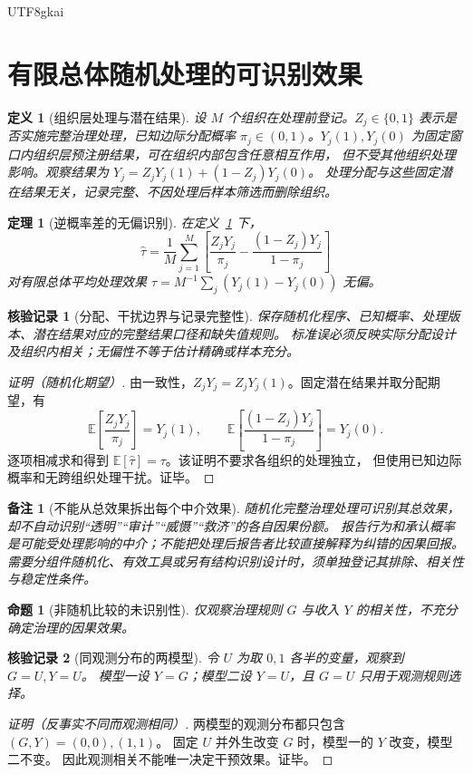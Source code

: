\documentclass[12pt,a4paper,openany]{report}
\newtheorem{definition}{定义}[chapter]
\newtheorem{theorem}{定理}[chapter]
\newtheorem{proposition}{命题}[chapter]
\newtheorem{remark}{备注}[chapter]
\newtheorem{Certificate}{核验记录}[chapter]
\newcommand{\EE}{\mathbb E}
\begin{document}
\begin{CJK*}{UTF8}{gkai}
\section{有限总体随机处理的可识别效果}

\begin{definition}[组织层处理与潜在结果]
\label{def:potential}
设 $M$ 个组织在处理前登记。$Z_j\in\{0,1\}$ 表示是否实施完整治理处理，已知边际分配概率
$\pi_j\in(0,1)$。$Y_j(1),Y_j(0)$ 为固定窗口内组织层预注册结果，可在组织内部包含任意相互作用，
但不受其他组织处理影响。观察结果为 $Y_j=Z_jY_j(1)+(1-Z_j)Y_j(0)$。
处理分配与这些固定潜在结果无关，记录完整、不因处理后样本筛选而删除组织。
\end{definition}

\begin{theorem}[逆概率差的无偏识别]
\label{thm:identification}
在定义~\ref{def:potential} 下，
\[
 \widehat\tau=\frac1M\sum_{j=1}^M
 \left[\frac{Z_jY_j}{\pi_j}-\frac{(1-Z_j)Y_j}{1-\pi_j}\right]
\]
对有限总体平均处理效果
$\tau=M^{-1}\sum_j(Y_j(1)-Y_j(0))$ 无偏。
\end{theorem}
\begin{Certificate}[分配、干扰边界与记录完整性]
保存随机化程序、已知概率、处理版本、潜在结果对应的完整结果口径和缺失值规则。
标准误必须反映实际分配设计及组织内相关；无偏性不等于估计精确或样本充分。
\end{Certificate}
\begin{proof}[证明（随机化期望）]
由一致性，$Z_jY_j=Z_jY_j(1)$。固定潜在结果并取分配期望，有
\[
 \EE\left[\frac{Z_jY_j}{\pi_j}\right]=Y_j(1),\qquad
 \EE\left[\frac{(1-Z_j)Y_j}{1-\pi_j}\right]=Y_j(0).
\]
逐项相减求和得到 $\EE[\widehat\tau]=\tau$。该证明不要求各组织的处理独立，
但使用已知边际概率和无跨组织处理干扰。证毕。
\end{proof}

\begin{remark}[不能从总效果拆出每个中介效果]
随机化完整治理处理可识别其总效果，却不自动识别“透明”“审计”“威慑”“救济”的各自因果份额。
报告行为和承认概率是可能受处理影响的中介；不能把处理后报告者比较直接解释为纠错的因果回报。
需要分组件随机化、有效工具或另有结构识别设计时，须单独登记其排除、相关性与稳定性条件。
\end{remark}

\begin{proposition}[非随机比较的未识别性]
\label{prop:confounding}
仅观察治理规则 $G$ 与收入 $Y$ 的相关性，不充分确定治理的因果效果。
\end{proposition}
\begin{Certificate}[同观测分布的两模型]
令 $U$ 为取 $0,1$ 各半的变量，观察到 $G=U,Y=U$。
模型一设 $Y=G$；模型二设 $Y=U$，且 $G=U$ 只用于观测规则选择。
\end{Certificate}
\begin{proof}[证明（反事实不同而观测相同）]
两模型的观测分布都只包含 $(G,Y)=(0,0),(1,1)$。
固定 $U$ 并外生改变 $G$ 时，模型一的 $Y$ 改变，模型二不变。
因此观测相关不能唯一决定干预效果。证毕。
\end{proof}


\end{CJK*}
\end{document}
